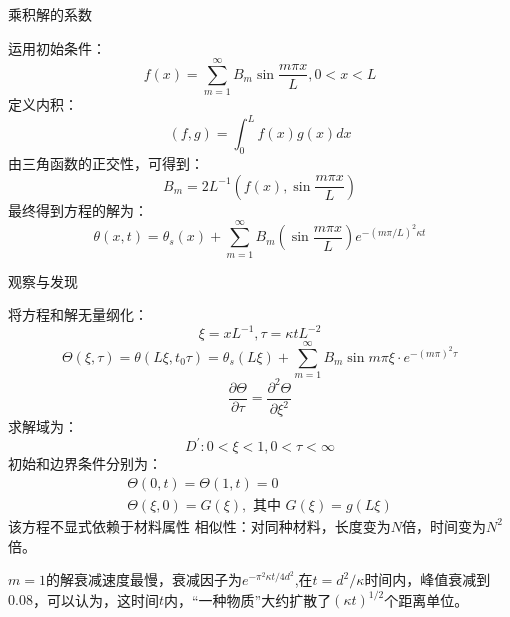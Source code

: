 \documentclass[10pt]{beamer}
\begin{document}
\begin{frame}[allowframebreaks]{乘积解的系数}

运用初始条件：
\begin{equation}
f(x)=\sum_{m=1}^{\infty} B_{m} \sin \frac{m \pi x}{L}, 0<x<L
\end{equation}
定义内积：
\begin{equation}
(f, g)=\int_{0}^{L} f(x) g(x) d x
\end{equation}
由三角函数的正交性，可得到：
\begin{equation}
B_{m}=2 L^{-1}\left(f(x), \sin \frac{m \pi x}{L}\right)
\end{equation}
最终得到方程的解为：
\begin{equation}
\theta(x, t)=\theta_{s}(x)+\sum_{m=1}^{\infty} B_{m}\left(\sin \frac{m \pi x}{L}\right) e^{-(m \pi / L)^{2} \kappa t}
\end{equation}

\end{frame}

\begin{frame}[allowframebreaks]{观察与发现}

将方程和解无量纲化：
\begin{equation}
\xi=x L^{-1},\tau=\kappa t L^{-2}
\end{equation}
\begin{equation}
\Theta(\xi, \tau)=\theta\left(L \xi, t_{0} \tau\right)=\theta_{s}(L \xi)+\sum_{m=1}^{\infty} B_{m} \sin m \pi \xi \cdot e^{-(m \pi)^{2} \tau}
\end{equation}
\begin{equation}
\frac{\partial \Theta}{\partial \tau}=\frac{\partial^{2} \Theta}{\partial \xi^{2}}
\end{equation}
求解域为：	
\begin{equation}
D^{\prime}: 0<\xi<1,0<\tau<\infty
\end{equation}
初始和边界条件分别为：
\begin{equation}
\begin{array}{c}
\Theta(0, t)=\Theta(1, t)=0 \\
\Theta(\xi, 0)=G(\xi), \text { 其中 } G(\xi)=g(L \xi)
\end{array}
\end{equation}
该方程不显式依赖于材料属性
相似性：对同种材料，长度变为$N$倍，时间变为$N^2$倍。

$m=1$的解衰减速度最慢，衰减因子为$ e^{-\pi^{2}\kappa t/4d^{2}}$,在$t=d^{2}/\kappa$时间内，峰值衰减到$0.08$，可以认为，这时间$t$内，“一种物质”大约扩散了$(\kappa t)^{1/2}$个距离单位。

\end{frame}
\end{document}
